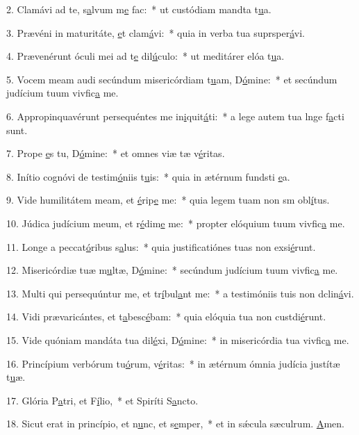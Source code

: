 2. Clamávi ad te, s\uline{a}lvum m\uline{e} fac:~* ut custódiam mandta t\uline{u}a.\par 
3. Prævéni in maturitáte, \uline{e}t clam\uline{á}vi:~* quia in verba tua suprsper\uline{á}vi.\par 
4. Prævenérunt óculi mei ad t\uline{e} dil\uline{ú}culo:~* ut meditárer elóa t\uline{u}a.\par 
5. Vocem meam audi secúndum misericórdiam t\uline{u}am, D\uline{ó}mine:~* et secúndum judícium tuum vivfic\uline{a} me.\par 
6. Appropinquavérunt persequéntes me in\uline{i}quit\uline{á}ti:~* a lege autem tua lnge f\uline{a}cti sunt.\par 
7. Prope \uline{e}s tu, D\uline{ó}mine:~* et omnes viæ tæ v\uline{é}ritas.\par 
8. Inítio cognóvi de testim\uline{ó}niis t\uline{u}is:~* quia in ætérnum fundsti \uline{e}a.\par 
9. Vide humilitátem meam, et \uline{é}rip\uline{e} me:~* quia legem tuam non sm obl\uline{í}tus.\par 
10. Júdica judícium meum, et r\uline{é}dim\uline{e} me:~* propter elóquium tuum vivfic\uline{a} me.\par 
11. Longe a peccat\uline{ó}ribus s\uline{a}lus:~* quia justificatiónes tuas non exsi\uline{é}runt.\par 
12. Misericórdiæ tuæ m\uline{u}ltæ, D\uline{ó}mine:~* secúndum judícium tuum vivfic\uline{a} me.\par 
13. Multi qui persequúntur me, et tr\uline{í}bul\uline{a}nt me:~* a testimóniis tuis non dclin\uline{á}vi.\par 
14. Vidi prævaricántes, et t\uline{a}besc\uline{é}bam:~* quia elóquia tua non custdi\uline{é}runt.\par 
15. Vide quóniam mandáta tua dil\uline{é}xi, D\uline{ó}mine:~* in misericórdia tua vivfic\uline{a} me.\par 
16. Princípium verbórum tu\uline{ó}rum, v\uline{é}ritas:~* in ætérnum ómnia judícia justítæ t\uline{u}æ.\par 
17. Glória P\uline{a}tri, et F\uline{í}lio,~* et Spiríti S\uline{a}ncto.\par 
18. Sicut erat in princípio, et n\uline{u}nc, et s\uline{e}mper,~* et in sǽcula sæculrum. \uline{A}men.\par 
